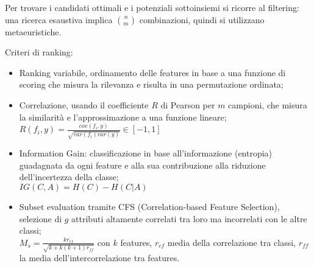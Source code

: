 Per trovare i candidati ottimali e i potenziali sottoinsiemi si ricorre al filtering: una ricerca esaustiva implica $\binom{n}{m}$ combinazioni, quindi si utilizzano metaeuristiche. 

Criteri di ranking:
\begin{itemize}
	\item Ranking variabile, ordinamento delle features in base a una funzione di scoring che misura la rilevanza e risulta in una permutazione ordinata;
	\item Correlazione, usando il coefficiente $R$ di Pearson per $m$ campioni, che misura la similarità e l'approssimazione a una funzione lineare; \\
	$R(f_i, y) = \frac{cov(f_i, y)}{\sqrt{var(f_i)var(y)}} \in [-1, 1]$
	\item Information Gain: classificazione in base all'informazione (entropia) guadagnata da ogni feature e alla sua contribuzione alla riduzione dell'incertezza della classe; \\
	$IG(C, A) = H(C) - H(C | A)$
	\item Subset evaluation tramite CFS (Correlation-based Feature Selection), selezione di $g$ attributi altamente correlati tra loro ma incorrelati con le altre classi; \\
	$M_s = \frac{k\overline{r_{cf}}}{\sqrt{k + k(k + 1)\overline{r_{ff}}}}$ con $k$ features, $r_{cf}$ media della correlazione tra classi, $r_{ff}$ la media dell'intercorrelazione tra features.
	\end{itemize}